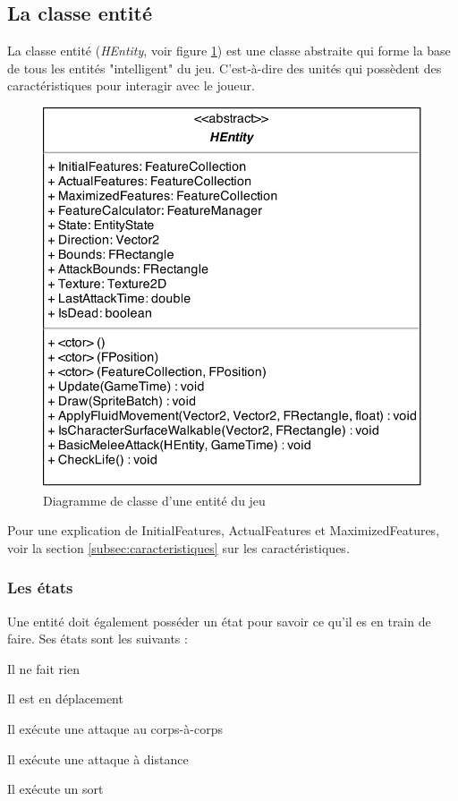 \documentclass[11pt, a4paper, oneside]{report}
\begin{document}
\subsection{La classe entité}
La classe entité (\textit{HEntity}, voir figure \ref{fig:HEntity}) est une classe abstraite qui forme la base de tous les entités "intelligent" du jeu. C'est-à-dire des unités qui possèdent des caractéristiques pour interagir avec le joueur.
\begin{figure}[h]
	\begin{center}
	\includegraphics[width=.6\textwidth]{HEntity}
	\caption{Diagramme de classe d'une entité du jeu}
	\label{fig:HEntity}
	\end{center}
\end{figure}
Pour une explication de InitialFeatures, ActualFeatures et MaximizedFeatures, voir la section \ref{subsec:caracteristiques} sur les caractéristiques.

\subsubsection{Les états}
Une entité doit également posséder un état pour savoir ce qu'il es en train de faire. Ses états sont les suivants : 
\begin{description}[labelindent=0.5cm]
	\item[S0 Idle] Il ne fait rien
	\item[S1 Running] Il est en déplacement
	\item[S2 MeleeAttacking] Il exécute une attaque au corps-à-corps
	\item[S3 RangeAttacking] Il exécute une attaque à distance
	\item[S4 SpellCasting] Il exécute un sort
\end{description}
\end{document}
